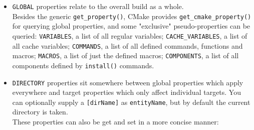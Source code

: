 \documentclass[8pt, table, xcdraw]{article}%
\begin{document}
\begin{itemize}
    \item \lstinline{GLOBAL} properties relate to the overall build as a whole.\\
    Besides the generic \lstinline{get_property()}, CMake provides \lstinline{get_cmake_property()} for querying global properties, and some "exclusive" pseudo-properties can be queried: \lstinline{VARIABLES}, a list of all regular variables; \lstinline{CACHE_VARIABLES}, a list of all cache variables; \lstinline{COMMANDS}, a list of all defined commands, functions and macros; \lstinline{MACROS}, a list of just the defined macros; \lstinline{COMPONENTS}, a list of all components defined by \lstinline{install()} commands.
    \item \lstinline{DIRECTORY} properties sit somewhere between global properties which apply everywhere and target properties which only affect individual targets. You can optionally supply a \lstinline{[dirName]} as \lstinline{entityName}, but by default the current directory is taken.\\
    These properties can also be get and set in a more concise manner:
    

\end{itemize}
\end{document}
